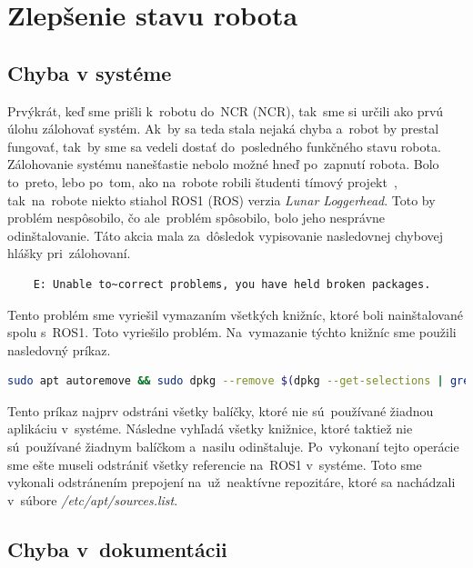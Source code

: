 
\section{Zlepšenie stavu robota}

\subsection{Chyba v systéme}
\label{subsec:brokenSystem}

Prvýkrát, keď sme prišli k~robotu do~NCR (\acrlong{NCR}), tak~sme si určili ako prvú úlohu zálohovať systém. Ak~by sa teda stala nejaká chyba
a~robot by prestal fungovať, tak~by sme sa vedeli dostať do~posledného funkčného stavu robota. Zálohovanie systému nanešťastie nebolo možné
hneď po~zapnutí robota. Bolo to~preto, lebo po~tom, ako na~robote robili študenti tímový projekt~\cite{timovyProjekt}, tak~na~robote niekto
stiahol ROS1 (\acrlong{ROS}) verzia \textit{Lunar Loggerhead}. Toto by problém nespôsobilo, čo ale~problém spôsobilo, bolo jeho nesprávne odinštalovanie.
Táto akcia mala za~dôsledok vypisovanie nasledovnej chybovej hlášky pri~zálohovaní.

\begin{lstlisting}
	E: Unable to~correct problems, you have held broken packages.
\end{lstlisting}

Tento problém sme vyriešil vymazaním všetkých knižníc, ktoré boli nainštalované spolu s~ROS1. Toto vyriešilo problém. Na~vymazanie týchto
knižníc sme použili nasledovný príkaz.

\begin{lstlisting}[language=bash]
	sudo apt autoremove && sudo dpkg --remove $(dpkg --get-selections | grep hold)
\end{lstlisting}

Tento príkaz najprv odstráni všetky balíčky, ktoré nie sú~používané žiadnou aplikáciu v~systéme. Následne vyhľadá všetky knižnice,
ktoré taktiež nie sú~používané žiadnym balíčkom a~nasilu odinštaluje. Po~vykonaní tejto operácie sme ešte museli odstrániť všetky referencie
na~ROS1 v~systéme. Toto sme vykonali odstránením prepojení na~už~neaktívne repozitáre, ktoré sa nachádzali v~súbore \textit{/etc/apt/sources.list}.

\subsection{Chyba v~dokumentácii}
\label{subsec:documentationIssue}

